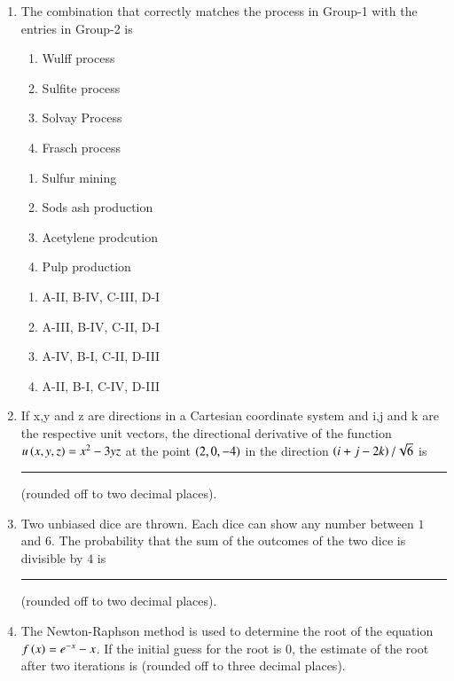 \documentclass[journal,12pt,onecolumn]{IEEEtran}
\theoremstyle{remark}
\begin{document}
\begin{enumerate}
    \item 
         The combination that correctly matches the process in Group-1 with the entries in Group-2 is
    
    \hfill{}

\begin{multicols}{2}
    \begin{enumerate}[label = \Alph*)]
        \item Wulff process
        \item Sulfite process
        \item Solvay Process
        \item Frasch process
    \end{enumerate}
\columnbreak
    \begin{enumerate}[label = \Roman*)]
        \item Sulfur mining
        \item Sods ash production 
        \item Acetylene prodcution
        \item Pulp production
    \end{enumerate}
\end{multicols}
\begin{multicols}{2}
    \begin{enumerate}
        \item A-II, B-IV, C-III, D-I
        \item A-III, B-IV, C-II, D-I
        \item A-IV, B-I, C-II, D-III
        \item A-II, B-I, C-IV, D-III
    \end{enumerate}
\end{multicols}

    \item If x,y and z are directions in a Cartesian coordinate system and i,j and k are the respective unit vectors, the directional derivative of the function $u\left(x,y,z\right) = x^2 - 3yz$ at the point $\left(2, 0,-4\right)$ in the direction $\left(i+j-2k\right)/\sqrt{6}$ is \rule{2cm}{0.1mm} (rounded off to two decimal places).
    
\hfill{}
    \item Two unbiased dice are thrown. Each dice can show any number between $1$ and $6$. The probability that the sum of the outcomes of the two dice is divisible by $4$ is \rule{1cm}{0.1mm}(rounded off to two decimal places).
    
\hfill{}
    \item The Newton-Raphson method is used to determine the root of the equation $f\left(x\right) = e^{-x} - x$. If the initial guess for the root is $0$, the estimate of the root after two iterations is (rounded off to three decimal places). 
    

\end{enumerate}
\end{document}
